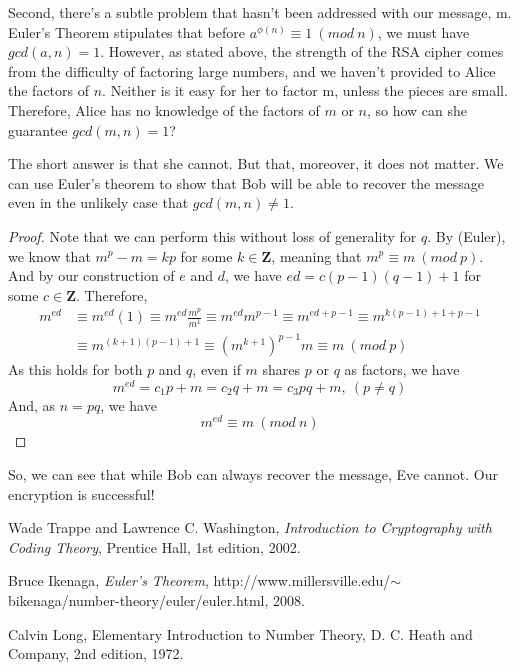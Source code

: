 \documentclass{article}
\begin{document}
        Second, there's a subtle problem that hasn't been addressed with our message, m.  
        Euler's Theorem stipulates that before $a^{\phi(n)}\equiv 1\ (mod\ n)$, we must have $gcd(a,n)=1$.  However, as stated above, the strength of the RSA cipher comes from the difficulty of factoring large numbers, and we haven't provided to Alice the factors of $n$.  
        Neither is it easy for her to factor m, unless the pieces are small.  Therefore, Alice has no knowledge of the factors of $m$ or $n$, so how can she guarantee $gcd(m,n)=1$?  
        
        The short answer is that she cannot.  But that, moreover, it does not matter.  
        We can use Euler's theorem to show that Bob will be able to recover the message even in the unlikely case that $gcd(m,n)\ne 1$.
        \begin{proof}
        	Note that we can perform this without loss of generality for $q$.
        	By (Euler), we know that $m^{p}-m=kp$ for some $k\in\mathbf{Z}$, meaning that $m^{p}\equiv m\ (mod\ p)$.  And by our construction of $e$ and $d$, we have $ed=c(p-1)(q-1)+1$ for some $c\in\mathbf{Z}$.  Therefore,
        	\begin{equation}
        	\begin{aligned}
        	m^{ed} &\equiv m^{ed}(1)\equiv m^{ed}\frac{m^p}{m^1} \equiv m^{ed}m^{p-1}\equiv m^{ed+p-1}\equiv m^{k(p-1)+1+p-1}\\
	        	&\equiv m^{(k+1)(p-1)+1}\equiv (m^{k+1})^{p-1}m\equiv m\ (mod\ p)
        	\end{aligned}
        	\end{equation}
        	As this holds for both $p$ and $q$, even if $m$ shares $p$ or $q$ as factors, we have $$m^{ed}=c_1p+m=c_2q+m=c_3pq+m,\ (p\ne q)$$ 
        	And, as $n=pq$, we have $$m^{ed}\equiv m\ (mod\ n)$$
        \end{proof}
        
        So, we can see that while Bob can always recover the message, Eve cannot.  Our encryption is successful!
        
        
        
        \begin{thebibliography}{}
		        Wade Trappe and Lawrence C. Washington,
		        \emph{Introduction to Cryptography with Coding Theory},
		        Prentice Hall,
		        1st edition,
		        2002.
		        
			    Bruce Ikenaga,
			    \emph{Euler's Theorem},
			    http://www.millersville.edu/$\sim$bikenaga/number-theory/euler/euler.html,
			    2008.
			    
			    Calvin Long,
			    Elementary Introduction to Number Theory,
			    D. C. Heath and Company,
			    2nd edition,
			    1972.
				
		        
        \end{thebibliography}
        
\end{document}
